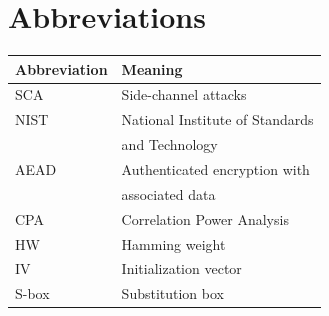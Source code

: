 \documentclass[11pt,technote]{IEEEtran}
\begin{document}
	\appendices
	
	 
	
	
	
	\section{Abbreviations}
	\begin{tabular}{ll}
		\hline
		\textbf{Abbreviation}&\textbf{Meaning}\\
		\hline
		SCA&Side-channel attacks\\
		NIST&National Institute of Standards\\
		&and Technology\\
		AEAD& Authenticated encryption with\\
		&associated data\\
		CPA&Correlation Power Analysis\\
		HW&Hamming weight\\
		IV&Initialization vector\\
		S-box&Substitution box\\
		\hline
	\end{tabular}
	
	
\end{document}

